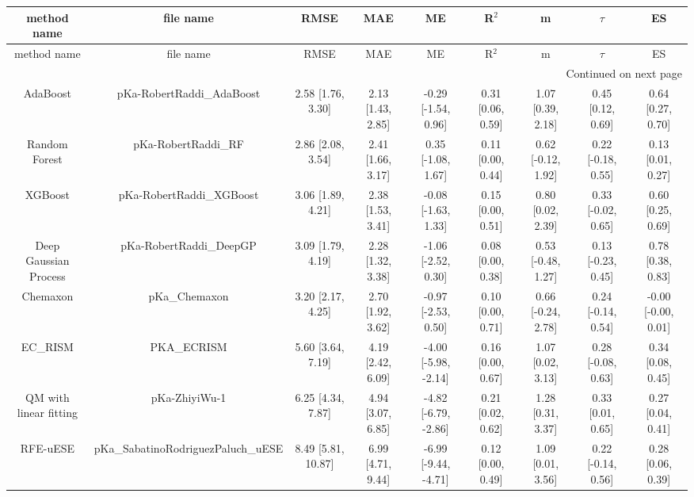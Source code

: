 \documentclass{article}
\begin{document}
\begin{center}
\scriptsize
\begin{longtable}{|ccccccccc|}
\toprule
           method name &                          file name &               RMSE &               MAE &                   ME &             R$^2$ &                  m &             $\tau$ &                  ES \\
\midrule
\endfirsthead

\toprule
           method name &                          file name &               RMSE &               MAE &                   ME &             R$^2$ &                  m &             $\tau$ &                  ES \\
\midrule
\endhead
\midrule
\multicolumn{9}{r}{{Continued on next page}} \\
\midrule
\endfoot

\bottomrule
\endlastfoot
              AdaBoost &          pKa-RobertRaddi\_AdaBoost &  2.58 [1.76, 3.30] & 2.13 [1.43, 2.85] &  -0.29 [-1.54, 0.96] & 0.31 [0.06, 0.59] &  1.07 [0.39, 2.18] &  0.45 [0.12, 0.69] &   0.64 [0.27, 0.70] \\
         Random Forest &                pKa-RobertRaddi\_RF &  2.86 [2.08, 3.54] & 2.41 [1.66, 3.17] &   0.35 [-1.08, 1.67] & 0.11 [0.00, 0.44] & 0.62 [-0.12, 1.92] & 0.22 [-0.18, 0.55] &   0.13 [0.01, 0.27] \\
               XGBoost &           pKa-RobertRaddi\_XGBoost &  3.06 [1.89, 4.21] & 2.38 [1.53, 3.41] &  -0.08 [-1.63, 1.33] & 0.15 [0.00, 0.51] &  0.80 [0.02, 2.39] & 0.33 [-0.02, 0.65] &   0.60 [0.25, 0.69] \\
 Deep Gaussian Process &            pKa-RobertRaddi\_DeepGP &  3.09 [1.79, 4.19] & 2.28 [1.32, 3.38] &  -1.06 [-2.52, 0.30] & 0.08 [0.00, 0.38] & 0.53 [-0.48, 1.27] & 0.13 [-0.23, 0.45] &   0.78 [0.38, 0.83] \\
              Chemaxon &                      pKa\_Chemaxon &  3.20 [2.17, 4.25] & 2.70 [1.92, 3.62] &  -0.97 [-2.53, 0.50] & 0.10 [0.00, 0.71] & 0.66 [-0.24, 2.78] & 0.24 [-0.14, 0.54] & -0.00 [-0.00, 0.01] \\
               EC_RISM &                        PKA\_ECRISM &  5.60 [3.64, 7.19] & 4.19 [2.42, 6.09] & -4.00 [-5.98, -2.14] & 0.16 [0.00, 0.67] &  1.07 [0.02, 3.13] & 0.28 [-0.08, 0.63] &   0.34 [0.08, 0.45] \\
QM with linear fitting &                      pKa-ZhiyiWu-1 &  6.25 [4.34, 7.87] & 4.94 [3.07, 6.85] & -4.82 [-6.79, -2.86] & 0.21 [0.02, 0.62] &  1.28 [0.31, 3.37] &  0.33 [0.01, 0.65] &   0.27 [0.04, 0.41] \\
              RFE-uESE & pKa\_SabatinoRodriguezPaluch\_uESE & 8.49 [5.81, 10.87] & 6.99 [4.71, 9.44] & -6.99 [-9.44, -4.71] & 0.12 [0.00, 0.49] &  1.09 [0.01, 3.56] & 0.22 [-0.14, 0.56] &   0.28 [0.06, 0.39] \\
\end{longtable}
\end{center}
\end{document}
